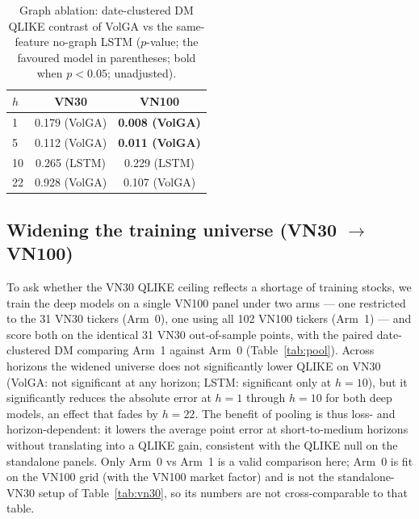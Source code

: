 \documentclass[runningheads]{llncs}
\begin{document}
\begin{table}[t]
\centering
\caption{Graph ablation: date-clustered DM QLIKE contrast of VolGA vs the same-feature no-graph LSTM
($p$-value; the favoured model in parentheses; bold when $p<0.05$; unadjusted).}
\label{tab:abl-graph}
\footnotesize
\setlength{\tabcolsep}{5pt}
\begin{tabular}{lcc}
\toprule
$h$ & VN30 & VN100 \\
\midrule
1  & 0.179 (VolGA) & \textbf{0.008 (VolGA)} \\
5  & 0.112 (VolGA) & \textbf{0.011 (VolGA)} \\
10 & 0.265 (LSTM)  & 0.229 (LSTM) \\
22 & 0.928 (VolGA) & 0.107 (VolGA) \\
\bottomrule
\end{tabular}
\end{table}

\subsection{Widening the training universe (VN30 $\to$ VN100)}\label{sec:pool}
To ask whether the VN30 QLIKE ceiling reflects a shortage of training stocks, we train the deep
models on a single VN100 panel under two arms --- one restricted to the 31 VN30 tickers (Arm~0),
one using all 102 VN100 tickers (Arm~1) --- and score both on the identical 31 VN30 out-of-sample
points, with the paired date-clustered DM comparing Arm~1 against Arm~0 (Table~\ref{tab:pool}).
Across horizons the widened universe does not significantly lower QLIKE on VN30 (VolGA: not
significant at any horizon; LSTM: significant only at $h{=}10$), but it significantly reduces the
absolute error at $h{=}1$ through $h{=}10$ for both deep models, an effect that fades by $h{=}22$.
The benefit of pooling is thus loss- and horizon-dependent: it lowers the average point error at
short-to-medium horizons without translating into a QLIKE gain, consistent with the QLIKE null on
the standalone panels. Only Arm~0 vs Arm~1 is a valid comparison here; Arm~0 is fit on the VN100
grid (with the VN100 market factor) and is not the standalone-VN30 setup of Table~\ref{tab:vn30},
so its numbers are not cross-comparable to that table.
\end{document}
